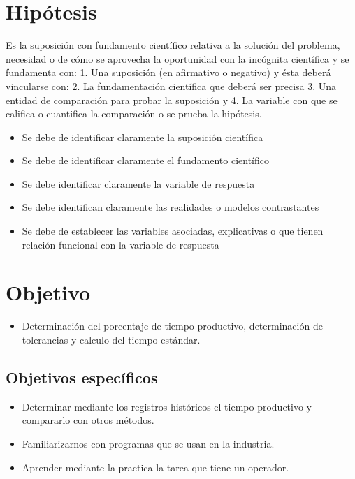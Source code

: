     \section{Hipótesis}
    
    Es la suposición con fundamento científico relativa a la solución del problema, necesidad o de cómo se aprovecha la oportunidad con la incógnita científica y se fundamenta con: 1. Una suposición (en afirmativo o negativo) y ésta deberá vincularse con:
    2. La fundamentación científica que deberá ser precisa 3. Una entidad de comparación para probar la suposición y
    4. La variable con que se califica o cuantifica la comparación o se prueba la hipótesis.
    
    \begin{itemize}
        \item Se debe de identificar claramente la suposición científica
        \item Se debe de identificar claramente el fundamento científico
        \item Se debe identificar claramente la variable de respuesta
        \item Se debe identifican claramente las realidades o modelos contrastantes
        \item Se debe de establecer las variables asociadas, explicativas o que tienen relación funcional con la variable de respuesta
    \end{itemize}
    \section{Objetivo}
    
    \begin{itemize}
        \item Determinación del porcentaje de tiempo productivo, determinación de tolerancias y calculo del tiempo estándar.
    \end{itemize}
    
    \subsection{Objetivos específicos }
    
    \begin{itemize}
        \item Determinar mediante los registros históricos el tiempo productivo y compararlo con otros métodos.
        \item Familiarizarnos con programas que se usan en la industria.
        \item Aprender mediante la practica la tarea que tiene un operador.
    \end{itemize}
    
